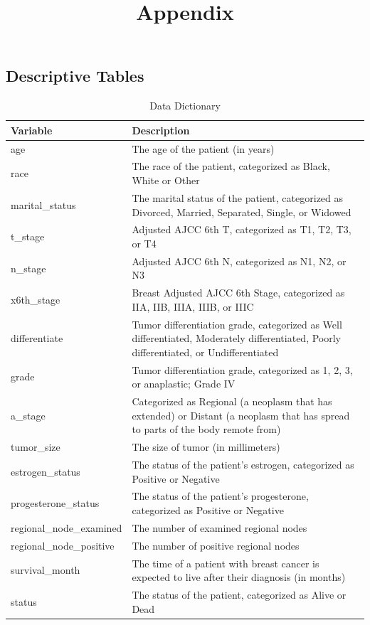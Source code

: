 \documentclass[
]{article}
\title{Appendix}
\author{}
\date{\vspace{-2.5em}}
\begin{document}
\maketitle

\subsection{Descriptive Tables}\label{descriptive-tables}

\begin{longtable}[t]{>{\raggedright\arraybackslash}p{12em}>{\raggedright\arraybackslash}p{32em}}
\caption{\label{tab:data_dictionary}Data Dictionary}\\
\toprule
Variable & Description\\
\midrule
age & The age of the patient (in years)\\
race & The race of the patient, categorized as Black, White or Other\\
marital\_status & The marital status of the patient, categorized as Divorced, Married, Separated, Single, or Widowed\\
t\_stage & Adjusted AJCC 6th T, categorized as T1, T2, T3, or T4\\
n\_stage & Adjusted AJCC 6th N, categorized as N1, N2, or N3\\
\addlinespace
x6th\_stage & Breast Adjusted AJCC 6th Stage, categorized as IIA, IIB, IIIA, IIIB, or IIIC\\
differentiate & Tumor differentiation grade, categorized as Well differentiated, Moderately differentiated, Poorly differentiated, or Undifferentiated\\
grade & Tumor differentiation grade, categorized as 1, 2, 3, or anaplastic; Grade IV\\
a\_stage & Categorized as Regional (a neoplasm that has extended) or Distant (a neoplasm that has spread to parts of the body remote from)\\
tumor\_size & The size of tumor (in millimeters)\\
\addlinespace
estrogen\_status & The status of the patient's estrogen, categorized as Positive or Negative\\
progesterone\_status & The status of the patient's progesterone, categorized as Positive or Negative\\
regional\_node\_examined & The number of examined regional nodes\\
regional\_node\_positive & The number of positive regional nodes\\
survival\_month & The time of a patient with breast cancer is expected to live after their diagnosis (in months)\\
\addlinespace
status & The status of the patient, categorized as Alive or Dead\\
\bottomrule
\end{longtable}
\end{document}
